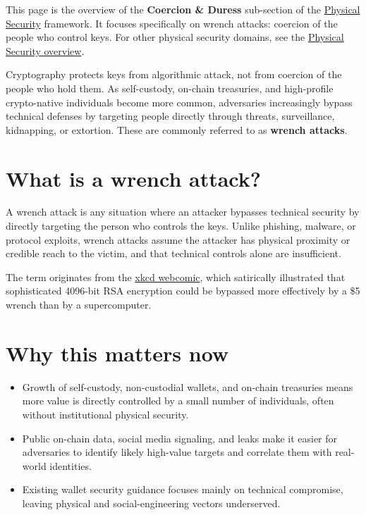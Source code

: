 This page is the overview of the \textbf{Coercion \& Duress} sub-section of the \href{https://frameworks.securityalliance.dev/physical-security/overview}{Physical Security} framework. It focuses specifically on wrench attacks: coercion of the people who control keys. For other physical security domains, see the \href{https://frameworks.securityalliance.dev/physical-security/overview}{Physical Security overview}.

Cryptography protects keys from algorithmic attack, not from coercion of the people who hold them. As self-custody, on-chain treasuries, and high-profile crypto-native individuals become more common, adversaries increasingly bypass technical defenses by targeting people directly through threats, surveillance, kidnapping, or extortion. These are commonly referred to as \textbf{wrench attacks}.

\section{What is a wrench attack?}\label{what-is-a-wrench-attack}

A wrench attack is any situation where an attacker bypasses technical security by directly targeting the person who controls the keys. Unlike phishing, malware, or protocol exploits, wrench attacks assume the attacker has physical proximity or credible reach to the victim, and that technical controls alone are insufficient.

The term originates from the \href{https://xkcd.com/538/}{xkcd webcomic}, which satirically illustrated that sophisticated 4096-bit RSA encryption could be bypassed more effectively by a \$5 wrench than by a supercomputer.

\section{Why this matters now}\label{why-this-matters-now}

\begin{itemize}
\tightlist
\item
  Growth of self-custody, non-custodial wallets, and on-chain treasuries means more value is directly controlled by a small number of individuals, often without institutional physical security.
\item
  Public on-chain data, social media signaling, and leaks make it easier for adversaries to identify likely high-value targets and correlate them with real-world identities.
\item
  Existing wallet security guidance focuses mainly on technical compromise, leaving physical and social-engineering vectors underserved.
\end{itemize}

